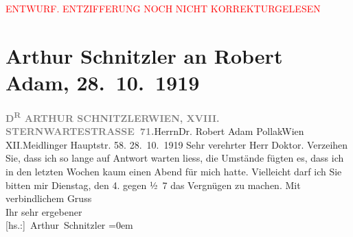 
\begin{center}
            \textcolor{red}{ENTWURF. ENTZIFFERUNG NOCH NICHT KORREKTURGELESEN}
                      \end{center}
            
               \section[Arthur Schnitzler an Robert Adam, 28. 10. 1919]{ Arthur Schnitzler an Robert Adam, 28. 10. 1919}\nopagebreak{}\rehead{ }\begin{ledgroupsized}[t]{13cm}\normalsize\beginnumbering{} \toendnotes[C]{\smallbreak\pagebreak[2]} 
\pstart{}{\pb}\textcolor{gray}{\textbf{D\textsuperscript{R} ARTHUR SCHNITZLER}}\pend{}\pstart{}\textcolor{gray}{\textbf{WIEN, XVIII. STERNWARTESTRASSE 71.}}\pend{}{\bigskip}\pstart{}Herrn\pend{}\pstart{}Dr. Robert Adam Pollak\pend{}\pstart{}Wien XII.\pend{}\pstart{}Meidlinger Hauptstr. 58.\pend{}{\bigskip}\pstart
           \raggedleft{}{\pb}28. 10. 1919\pend
           \pstart{}Sehr verehrter Herr Doktor.\pend\pstart
           Verzeihen Sie, dass ich so lange auf Antwort warten liess, die Umstände fügten
                    es, dass ich in den letzten Wochen kaum einen Abend für mich hatte. Vielleicht
                    darf ich Sie bitten mir Dienstag, den 4. gegen ½ 7 das
                    Vergnügen zu machen.\pend
           \pstart
           Mit verbindlichem Gruss{\\[\baselineskip]}Ihr sehr ergebener{\\[\baselineskip]}\spacefill\mbox{{[}hs.:{]} Arthur Schnitzler}\pend
           \leftskip=0em{}\endnumbering{}\end{ledgroupsized}  \newcommand{\dateiname}{L02330}\newcommand{\titel}{Arthur Schnitzler an Robert Adam, 28. 10. 1919}\newcommand{\editorInnen}{Martin Anton Müller und Gerd-Hermann Susen}
      